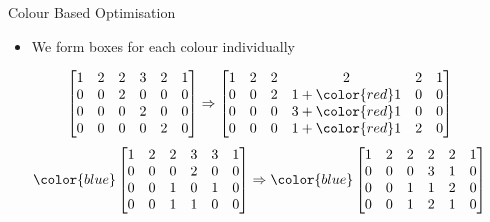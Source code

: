 \begin{frame}{Colour Based Optimisation}
	\begin{itemize}
		\item We form boxes for each colour individually
	\end{itemize}
	\begin{align*}
    \begin{bmatrix}
    1&2&2&3&2&1\\
    0&0&2&0&0&0\\
    0&0&0&2&0&0\\
    0&0&0&0&2&0
    \end{bmatrix} \Rightarrow
    \begin{bmatrix}
     1&2&2&2&2&1\\
	     0&0&2&1+\color{red}1&0&0\\
	     0&0&0&3+\color{red}1&0&0\\
	     0&0&0&1+\color{red}1&2&0
     \end{bmatrix}
	\end{align*}
	\begin{align*}
    \color{blue}
    \begin{bmatrix}
        1&2&2&3&3&1\\
        0&0&0&2&0&0\\
        0&0&1&0&1&0\\
        0&0&1&1&0&0\\
    \end{bmatrix}\Rightarrow
    \color{blue}
    \begin{bmatrix}
        1&2&2&2&2&1\\
        0&0&0&3&1&0\\
        0&0&1&1&2&0\\
        0&0&1&2&1&0\\
    \end{bmatrix}
	\end{align*}
\end{frame}
